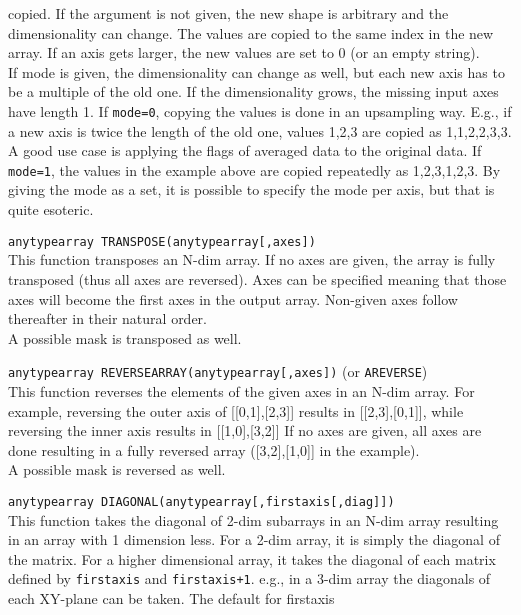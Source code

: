 \begin{description}
    copied. If the argument is not given, the new shape is arbitrary
    and the dimensionality can change. The values are copied to the same index in the
    new array. If an axis gets larger, the new values are set to 0
    (or an empty string).
    \\If mode is given, the dimensionality can change as well, but
    each new axis has to be a multiple of the old one. If the
    dimensionality grows, the missing input axes have length 1.
    If \texttt{mode=0}, copying the values is
    done in an upsampling way. E.g., if a new axis is twice the length
    of the old one, values 1,2,3 are copied as 1,1,2,2,3,3. A good use case is
    applying the flags of averaged data to the original data. 
    If \texttt{mode=1}, the values in the example above are copied
    repeatedly as 1,2,3,1,2,3.
    By giving the mode as a set, it is possible to specify the mode
    per axis, but that is quite esoteric. 
  \item[] \texttt{anytypearray TRANSPOSE(anytypearray[,axes])}\\
    This function transposes an N-dim array. If no axes
    are given, the array is fully transposed (thus all axes are
    reversed). Axes can be specified meaning that those axes will become the
    first axes in the output array. Non-given axes follow thereafter
    in their natural order.
    \\A possible mask is transposed as well.
  \item[] \texttt{anytypearray REVERSEARRAY(anytypearray[,axes])}  (or \texttt{AREVERSE})\\
    This function reverses the elements of the given axes in an N-dim array.
    For example, reversing the outer axis of [[0,1],[2,3]] results in
    [[2,3],[0,1]], while reversing the inner axis results in [[1,0],[3,2]]
    If no axes are given, all axes are done resulting in a fully
    reversed array ([3,2],[1,0]] in the example).
    \\A possible mask is reversed as well.
  \item[] \texttt{anytypearray DIAGONAL(anytypearray[,firstaxis[,diag]])}\\
    This function takes the diagonal of 2-dim subarrays in an N-dim array resulting in
    an array with 1 dimension less. For a 2-dim array, it is simply the
    diagonal of the matrix. For a higher dimensional array, it takes
    the diagonal of each matrix defined by \texttt{firstaxis} and
    \texttt{firstaxis+1}. e.g., in a 3-dim array the
    diagonals of each XY-plane can be taken. The default for firstaxis

\end{description}

